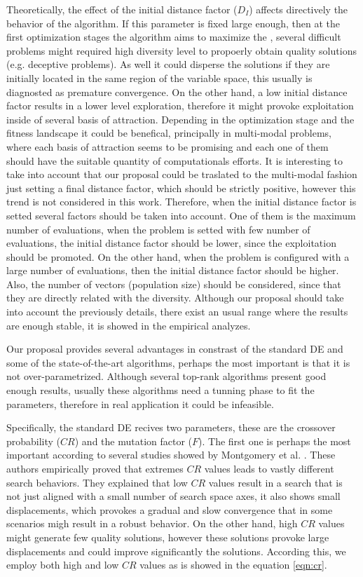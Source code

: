 %
Theoretically, the effect of the initial distance factor ($D_I$) affects directively the behavior of the algorithm.
%
If this parameter is fixed large enough, then at the first optimization stages the algorithm aims to maximize the \DCN{}, several difficult problems might required high diversity level to propoerly obtain quality solutions (e.g. deceptive problems).
%
As well it could disperse the solutions if they are initially located in the same region of the variable space, this usually is diagnosted as premature convergence.
%
On the other hand, a low initial distance factor results in a lower level exploration, therefore it might provoke exploitation inside of several basis of attraction.
%
Depending in the optimization stage and the fitness landscape it could be benefical, principally in multi-modal problems, where each basis of attraction seems to be promising and each one of them should have the suitable quantity of computationals efforts.
%
It is interesting to take into account that our proposal could be traslated to the multi-modal fashion just setting a final distance factor, which should be strictly positive, however this trend is not considered in this work.
%
Therefore, when the initial distance factor is setted several factors should be taken into account.
%
One of them is the maximum number of evaluations, when the problem is setted with few number of evaluations, the initial distance factor should be lower, since the exploitation should be promoted.
%
On the other hand, when the problem is configured with a large number of evaluations, then the initial distance factor should be higher.
%
Also, the number of vectors (population size) should be considered, since that they are directly related with the diversity.
%
Although our proposal should take into account the previously details, there exist an usual range where the results are enough stable, it is showed in the empirical analyzes.
%

Our proposal provides several advantages in constrast of the standard DE and some of the state-of-the-art algorithms, perhaps the most important is that it is not over-parametrized.
%
Although several top-rank algorithms present good enough results, usually these algorithms need a tunning phase to fit the parameters, therefore in real application it could be infeasible.

%
Specifically, the standard DE recives two parameters, these are the crossover probability ($CR$) and the mutation factor ($F$).
%
The first one is perhaps the most important according to several studies showed by Montgomery et al. \cite{montgomery2010analysis}.
%
These authors empirically proved that extremes $CR$ values leads to vastly different search behaviors.
%
They explained that low $CR$ values result in a search that is not just aligned with a small number of search space axes, it also shows small displacements, which provokes a gradual and slow convergence that in some scenarios migh result in a robust behavior.
%
On the other hand, high $CR$ values might generate few quality solutions, however these solutions provoke large displacements and could improve significantly the solutions.
%
According this, we employ both high and low $CR$ values as is showed in the equation \ref{eqn:cr}.

